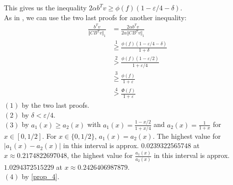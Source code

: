 This gives us the inequality $2\alpha b^Tv\geq \phi(f)(1-\varepsilon/4-\delta)$.\\
As in \cite{nmfnlt}, we can use the two last proofs for another inequality:
\begin{align*}
\frac{b^Tv}{\Vert CB^Tv\Vert_1}&=\frac{2\alpha b^Tv}{2\alpha \Vert CB^Tv\Vert_1}\\
&\stackrel{1}{\geq}\frac{\phi(f)(1-\varepsilon/4-\delta)}{1+\delta}\\
&\stackrel{2}{>}\frac{\phi(f)(1-\varepsilon/2)}{1+\varepsilon/4}\\
&\stackrel{3}{\geq} \frac{\phi(f)}{1+\varepsilon}\\
&\stackrel{4}{>} \frac{\Phi(f)}{1+\varepsilon}
\end{align*}
$(1)$ by the two last proofs.\\
$(2)$ by $\delta<\varepsilon/4$.\\
$(3)$ by $a_1(x)\geq a_2(x)$ with $a_1(x)=\frac{1-x/2}{1+x/4}$ and $a_2(x)=\frac{1}{1+x}$ for $x\in[0,1/2]$. For $x\in\{0,1/2\}$, $a_1(x)=a_2(x)$. The highest value for $\vert a_1(x)-a_2(x)\vert$ in this interval is approx. $0.0239322565748$ at $x\approx 0.2174822697048$, the highest value for $\frac{a_1(x)}{a_2(x)}$ in this interval is approx. $1.0294372515229$ at $x\approx 0.2426406987879$.\\
$(4)$ by \ref{prop_4}.
